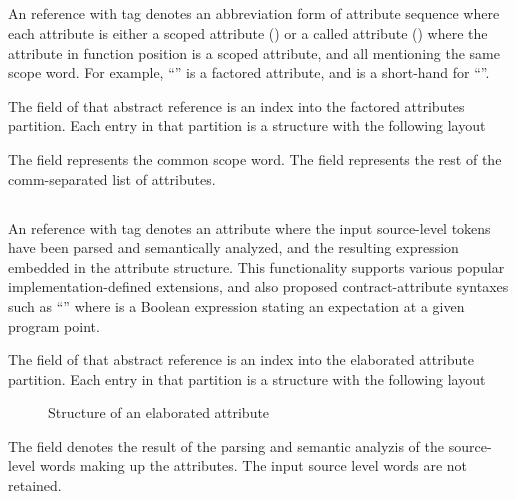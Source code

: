 
\subsection{}
\label{sec:ifc:AttrSort:Factored}

An  reference with tag  denotes an abbreviation form of attribute
sequence where each attribute is either a scoped attribute () 
or a called attribute () where the attribute in function position 
is a scoped attribute, and all mentioning the same scope word.  For example, 
``'' is a factored attribute, and is a short-hand for 
``''.

The  field of that abstract reference is an index into the factored attributes partition.
Each entry in that partition is a structure with the following layout
%
\begin{figure}[H]
    \centering
\end{figure}
%
The  field represents the common scope word.  The field  represents the 
rest of the comm-separated list of attributes.


\subsection{}
\label{sec:ifc:AttrSort:Elaborated}

An  reference with tag  denotes an attribute 
where the input source-level tokens have been parsed and semantically analyzed, and the resulting
expression embedded in the attribute structure.  This functionality supports various popular
implementation-defined extensions, and also proposed contract-attribute syntaxes such as
``'' where  is a Boolean expression stating an
expectation at a given program point.

The  field of that abstract reference is an index into the elaborated attribute partition.
Each entry in that partition is a structure with the following layout
%
\begin{figure}[H]
    \centering
    \caption{Structure of an elaborated attribute}
    \label{fig:ifc:AttrSort:Elaborated}
\end{figure}
%
The  field denotes the result of the parsing and semantic analyzis of the 
source-level words making up the attributes.  The input source level words are not retained.

